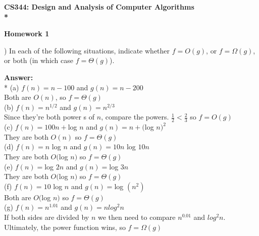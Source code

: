 \documentclass{article}
\begin{document}
\begin{center}
\bf{\LARGE CS344: Design and Analysis of Computer Algorithms} \\*

\vspace{0.2in}
{\bf {\Large Homework 1}}
\end{center}

\vspace{.2in}


\vspace{.2in}
) In each of the following situations, indicate whether $f  = O(g)$, or $f = \Omega(g)$, 
\indent or both (in which case $f = \Theta(g)$).

\vspace{.1in}
{\bf Answer:} \\*
\indent (a) $f(n) = n - 100$ and $g(n) = n - 200$ \\
\indent \indent Both are $O(n)$, so $f = \Theta(g)$ \\

\indent (b) $f(n) = n^{1/2}$ and $g(n) = n^{2/3}$\\
\indent \indent Since they're both power s of $n$, compare the powers. $\frac{1}{2} < \frac{2}{3}$ so $f = O(g)$ \\

\indent (c) $f(n) = 100n + $log $n$ and $g(n) = n + ($log $n)^2$\\
\indent \indent They are both $O(n)$ so $f = \Theta(g)$ \\

\indent (d) $f(n)  = n$ log $n$ and $g(n) = 10n$ log $10n$\\
\indent \indent They are both $O($log $n)$ so $f = \Theta(g)$ \\

\indent (e) $f(n) = $log $2n$ and $g(n) = $log $3n$\\
\indent \indent They are both $O($log $n)$ so $f = \Theta(g)$ \\

\indent (f) $f(n) = 10$ log $n$ and $g(n) = $log $(n^2)$ \\
\indent \indent Both are $O($log $n)$ so $f = \Theta(g)$ \\

\indent (g) $f(n) = n^{1.01}$ and $g(n) = n log^2n$\\
\indent \indent If both sides are divided by $n$ we then need to compare $n^{0.01}$ and $log^2n$. \\
\indent \indent Ultimately, the power function wins, so $f = \Omega(g)$\\
\end{document}
